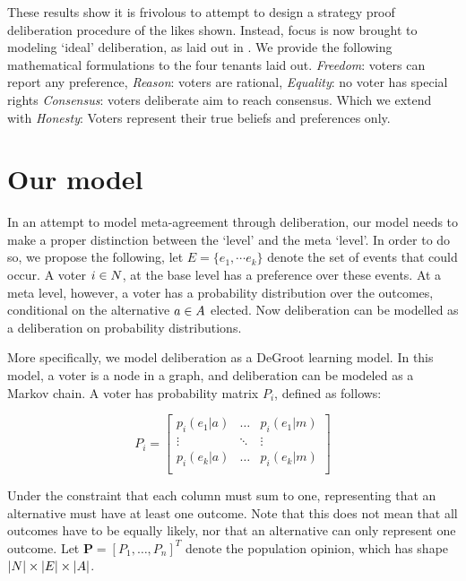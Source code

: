 These results show it is frivolous to attempt to design a strategy proof deliberation procedure of the likes shown. Instead, focus is now brought to modeling `ideal' deliberation, as laid out in . We provide the following mathematical formulations to the four tenants laid out. \textit{Freedom}: voters can report any preference, \textit{Reason}: voters are rational, \textit{Equality}: no voter has special rights \textit{Consensus}:  voters deliberate aim to reach consensus. Which we extend with \textit{Honesty}: Voters represent their true beliefs and preferences only.


\section{Our model}
\label{sec: main model}


In an attempt to model meta-agreement through deliberation, our model needs to make a proper distinction between the `level' and the meta `level'. In order to do so, we propose the following, let \(E = \{e_{1}, \cdots e_{k}\}\) denote the set of events that could occur. A voter $i \in N$, at the base level has a preference over these events. At a meta level, however, a voter has a probability distribution over the outcomes, conditional on the alternative \(a \in A\) elected. Now deliberation can be modelled as a deliberation on probability distributions.

More specifically, we model deliberation as a DeGroot learning model. In this model, a voter is a node in a graph, and deliberation can be modeled as a Markov chain. A voter has probability matrix $P_i$, defined as follows:

\[
    P_i =\begin{bmatrix}
        p_i(e_1 | a) & \dots  & p_i(e_1 | m) \\
        \vdots       & \ddots & \vdots       \\
        p_i(e_k | a) & \dots  & p_i(e_k | m) \\
    \end{bmatrix}
\]

Under the constraint that each column must sum to one, representing that an alternative must have at least one outcome. Note that this does not mean that all outcomes have to be equally likely, nor that an alternative can only represent one outcome.  Let $\boldsymbol{P}= [P_1, \dots, P_{n}]^{T}$ denote the population opinion, which has shape \(|N| \times |E| \times |A|\).

